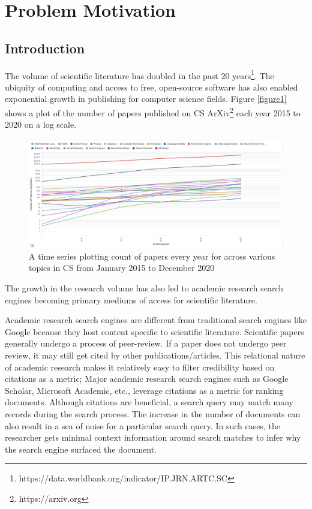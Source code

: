 \chapter{Problem Motivation}

\section{Introduction}    

The volume of scientific literature has doubled in the past 20 years\footnote{https://data.worldbank.org/indicator/IP.JRN.ARTC.SC}.  
The ubiquity of computing and access to free, open-source software has also enabled exponential growth in publishing for computer science fields.  
Figure \ref{figure1} shows a plot of the number of papers published on CS ArXiv\footnote{https://arxiv.org} each year 2015 to 2020 on a log scale. 

\begin{figure}[h]
    \centering
    \includegraphics[width=\maxwidth{\textwidth}]{src/images/num-papers.pdf}
    \caption{ A time series plotting count of papers every year for across various topics in CS from January 2015 to December 2020}
    \label{figure\arabic{figurecounter}}
\end{figure}

The growth in the research volume has also led to academic research search engines becoming primary mediums of access for scientific literature. 

Academic research search engines are different from traditional search engines like Google because they host content specific to scientific literature. 
Scientific papers generally undergo a process of peer-review. If a paper does not undergo peer review, it may still get cited by other publications/articles. This relational nature of academic research makes it relatively easy to filter credibility based on citations as a metric; Major academic research search engines such as Google Scholar, Microsoft Academic, etc., leverage citations as a metric for ranking documents. Although citations are beneficial, a search query may match many records during the search process. The increase in the number of documents can also result in a sea of noise for a particular search query. In such cases, the researcher gets minimal context information around search matches to infer why the search engine surfaced the document. 

